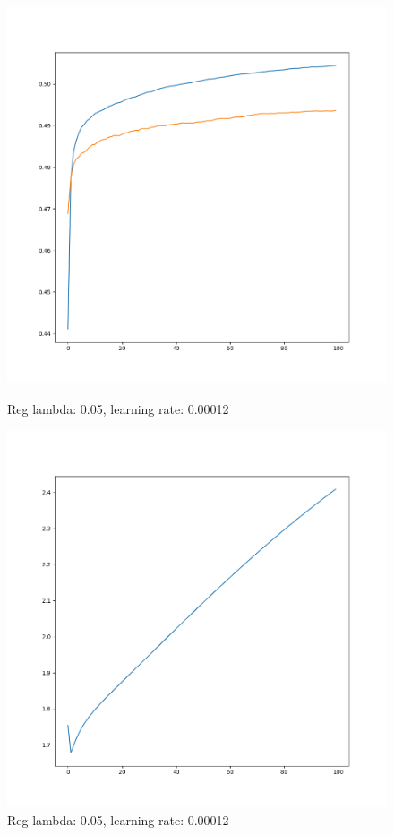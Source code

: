 \documentclass[11pt]{article}
\begin{document}
\begin{figure}[h]
	\begin{minipage}{0.5 \textwidth}
		\centering
		\includegraphics[width=1 \textwidth]{figure/HOG_Log_Acc_Reg-0.05_Learn-0.00012_CV.png}
		\caption{Reg lambda: 0.05, learning rate: 0.00012}
		\label{fig:HOG_Log_Acc_Reg-0.05_Learn-0.00012}
	\end{minipage}
	\begin{minipage}{0.5 \textwidth}
		\centering
		\includegraphics[width=1 \textwidth]{figure/HOG_Log_Loss_Reg-0.05_Learn-0.00012_CV.png}
		\caption{Reg lambda: 0.05, learning rate: 0.00012}
		\label{fig:HOG_Log_Loss_Reg-0.05_Learn-0.00012}
	\end{minipage}
\end{figure}
\end{document}
